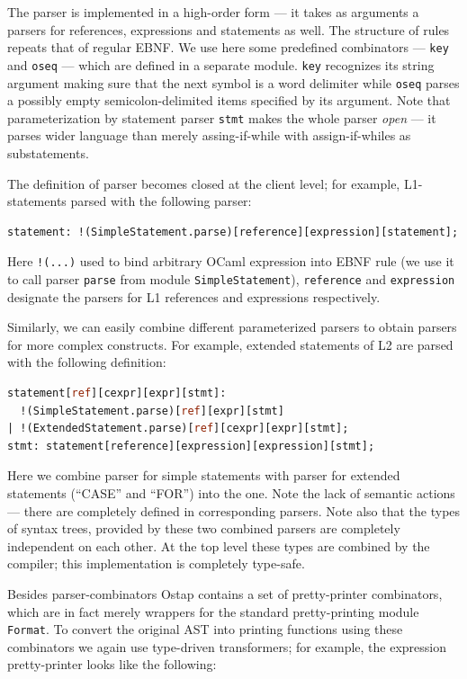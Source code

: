 The parser is implemented in a high-order form --- it takes as arguments a parsers
for references, expressions and statements as well. The structure of rules
repeats that of regular EBNF. We use here some predefined combinators --- \lstinline{key} 
and \lstinline{oseq} --- which are defined in a separate module. \lstinline{key} recognizes
its string argument making sure that the next symbol is a word delimiter while \lstinline{oseq}
parses a possibly empty semicolon-delimited items specified by its argument. Note that 
parameterization by statement parser \lstinline{stmt} makes the whole parser \emph{open} ---
it parses wider language than merely assing-if-while with assign-if-whiles as substatements.

The definition of parser becomes closed at the client level; for example, L1-statements
parsed with the following parser:

\begin{lstlisting}[language=ocaml]
statement: !(SimpleStatement.parse)[reference][expression][statement];
\end{lstlisting}

Here \lstinline{!(...)} used to bind arbitrary OCaml expression into EBNF rule (we use it
to call parser \lstinline{parse} from module \lstinline{SimpleStatement}), \lstinline{reference} and
\lstinline{expression} designate the parsers for L1 references and expressions respectively.

Similarly, we can easily combine different parameterized parsers to obtain parsers for more
complex constructs. For example, extended statements of L2 are parsed with the following
definition:

\begin{lstlisting}[language=ocaml]
statement[ref][cexpr][expr][stmt]: 
  !(SimpleStatement.parse)[ref][expr][stmt]
| !(ExtendedStatement.parse)[ref][cexpr][expr][stmt];
stmt: statement[reference][expression][expression][stmt];
\end{lstlisting}

Here we combine parser for simple statements with parser for extended statements (``CASE'' and ``FOR'')
into the one. Note the lack of semantic actions --- there are completely defined in corresponding
parsers. Note also that the types of syntax trees, provided by these two combined parsers are completely 
independent on each other. At the top level these types are combined by the compiler; this implementation 
is completely type-safe.

Besides parser-combinators Ostap contains a set of pretty-printer combinators, which are
in fact merely wrappers for the standard pretty-printing module \lstinline{Format}. To
convert the original AST into printing functions using these combinators we again
use type-driven transformers; for example, the expression pretty-printer looks like
the following:

